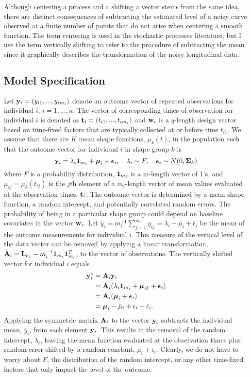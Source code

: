  Although centering a process and a shifting a vector stems from the same idea, there are distinct consequences of subtracting the estimated level of a noisy curve observed at a finite number of points that do not arise when centering a smooth function. The term centering is used in the stochastic processes literature, but I use the term vertically shifting to refer to the procedure of subtracting the mean since it graphically describes the transformation of the noisy longitudinal data.

\subsection{Model Specification}
 Let $\mathbf y_{i}=(y_{i1},...,y_{im_{i}})$ denote an outcome vector of repeated observations for individual $i$, $i=1,...,n$. The vector of corresponding times of observation for individual $i$ is denoted as $\mathbf t_{i}=(t_{i1},...,t_{im_{i}})$ and $\mathbf w_{i}$ is a $q$-length design vector based on time-fixed factors that are typically collected at or before time $t_{i1}$. We assume that there are $K$ mean shape functions, $\mu_{k}(t)$, in the population such that the outcome vector for individual $i$ in shape group $k$ is
 $$\mathbf y_{i} = \lambda_{i}\mathbf 1_{m_{i}}+\boldsymbol\mu_{i}+\boldsymbol\epsilon_{i},\quad \lambda_{i}\sim F, \quad \boldsymbol\epsilon_{i}\sim N(0,\boldsymbol\Sigma_{k})$$
 where $F$ is a probability distribution, $\mathbf 1_{m_{i}}$ is a m-length vector of 1's, and $\mu_{ij} = \mu_{k}(t_{ij})$ is the $j$th element of a $m_{i}$-length vector of mean values evaluated at the observation times, $\mathbf t_{i}$. The outcome vector is determined by a mean shape function, a random intercept, and potentially correlated random errors. The probability of being in a particular shape group could depend on baseline covariates in the vector $\mathbf w_{i}$. Let $\bar{y}_{i}= m_{i}^{-1}\sum^{m_{i}}_{j=1} y_{ij} = \lambda_{i}+\bar{\mu}_{i}+\bar{\epsilon}_{i}$ be the mean of the outcome measurements for individual $i$. This measure of the vertical level of the data vector can be removed by applying a linear transformation, $\mathbf A_{i} = \mathbf I_{m_{i}} - m_{i}^{-1}\mathbf 1_{m_{i}}\mathbf 1_{m_{i}}^{T}$, to the vector of observations. The vertically shifted vector for individual $i$ equals 
\begin{align*}
\mathbf y^{*}_{i} &= \mathbf A_{i}\mathbf y_{i}\\
&=\mathbf A_{i}(\lambda_{i}\mathbf 1_{m_{i}}+\boldsymbol\mu_{ik}+\boldsymbol\epsilon_{i})\\
&=\mathbf A_{i}(\boldsymbol\mu_{i}+\boldsymbol\epsilon_{i})\\
&=\boldsymbol\mu_{i} - \bar{\mu}_{i}+\epsilon_{i}-\bar{\epsilon}_{i}.
\end{align*}
Applying the symmetric matrix $\mathbf A_{i}$ to the vector $\mathbf y_{i}$ subtracts the individual mean, $\bar{y}_{i}$, from each element $\mathbf y_{i}$. This results in the removal of the random intercept, $\lambda_{i}$, leaving the mean function evaluated at the observation times plus random error shifted by a random constant, $\bar{\mu}_{i}+\bar{\epsilon}_{i}$. Clearly, we do not have to worry about $F$, the distribution of the random intercept, or any other time-fixed factors that only impact the level of the outcome. 

